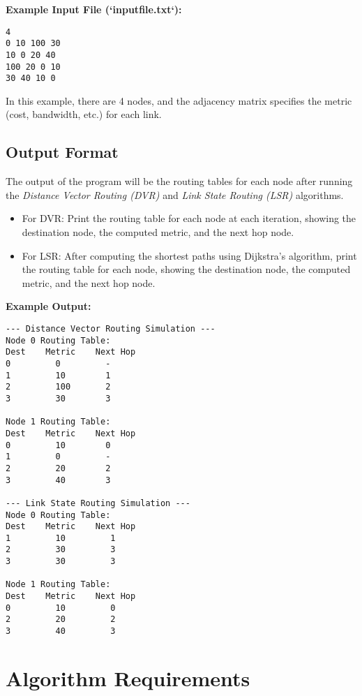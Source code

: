 \documentclass[12pt,a4paper]{article}
\begin{document}
\textbf{Example Input File (`inputfile.txt`):}

\begin{verbatim}
4 
0 10 100 30 
10 0 20 40 
100 20 0 10 
30 40 10 0
\end{verbatim}

In this example, there are 4 nodes, and the adjacency matrix specifies the metric (cost, bandwidth, etc.) for each link.

\subsection*{Output Format}
The output of the program will be the routing tables for each node after running the \emph{Distance Vector Routing (DVR)} and \emph{Link State Routing (LSR)} algorithms. 

\begin{itemize}
    \item For DVR: Print the routing table for each node at each iteration, showing the destination node, the computed metric, and the next hop node.
    \item For LSR: After computing the shortest paths using Dijkstra's algorithm, print the routing table for each node, showing the destination node, the computed metric, and the next hop node.
\end{itemize}

\textbf{Example Output:}

\begin{verbatim}
--- Distance Vector Routing Simulation ---
Node 0 Routing Table:
Dest    Metric    Next Hop
0         0         -
1         10        1
2         100       2
3         30        3

Node 1 Routing Table:
Dest    Metric    Next Hop
0         10        0
1         0         -
2         20        2
3         40        3

--- Link State Routing Simulation ---
Node 0 Routing Table:
Dest    Metric    Next Hop
1         10         1
2         30         3
3         30         3

Node 1 Routing Table:
Dest    Metric    Next Hop
0         10         0
2         20         2
3         40         3
\end{verbatim}

\section*{Algorithm Requirements}
\end{document}
